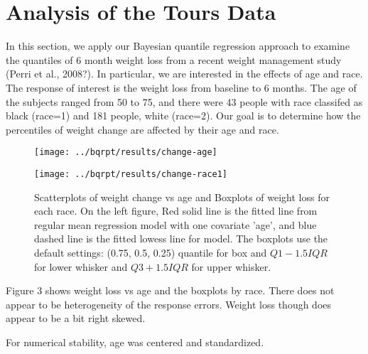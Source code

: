\documentclass[12pt]{article}
\begin{document}
\section{Analysis of the Tours Data}
In this section, we apply our Bayesian quantile regression approach to
examine the quantiles of 6 month weight loss from a recent weight
management study (Perri et al., 2008?).  In particular, we are
interested in the effects of age and race.  The response of interest
is the weight loss from baseline to 6 months. The age of the subjects
ranged from 50 to 75, and there were 43 people with race classifed as
black (race=1) and 181 people, white (race=2).  Our goal is to
determine how the percentiles of weight change are affected by their
age and race.

\begin{figure}[h]
  \begin{minipage}{0.5\linewidth}
    \centerline{\texttt{[image: ../bqrpt/results/change-age]}}
  \end{minipage}
  \begin{minipage}{0.5\linewidth}
    \centerline{\texttt{[image: ../bqrpt/results/change-race1]}}
  \end{minipage}

  \caption[]{\label{fig:tours} Scatterplots of weight change vs age
    and Boxplots of weight loss for each race. On the left figure, Red
    solid line is the fitted line from regular mean regression model
    with one covariate 'age', and blue dashed line is the fitted
    lowess line for model.  The boxplots use the default settings:
    (0.75, 0.5, 0.25) quantile for box and $Q1-1.5IQR$ for lower
    whisker and $Q3+1.5IQR$ for upper whisker. }
\end{figure}

Figure 3 shows weight loss vs age and the boxplots by race.  There
does not appear to be heterogeneity of the response errors. Weight
loss though does appear to be a bit right skewed.

For numerical stability, age was centered and standardized.
\end{document}
